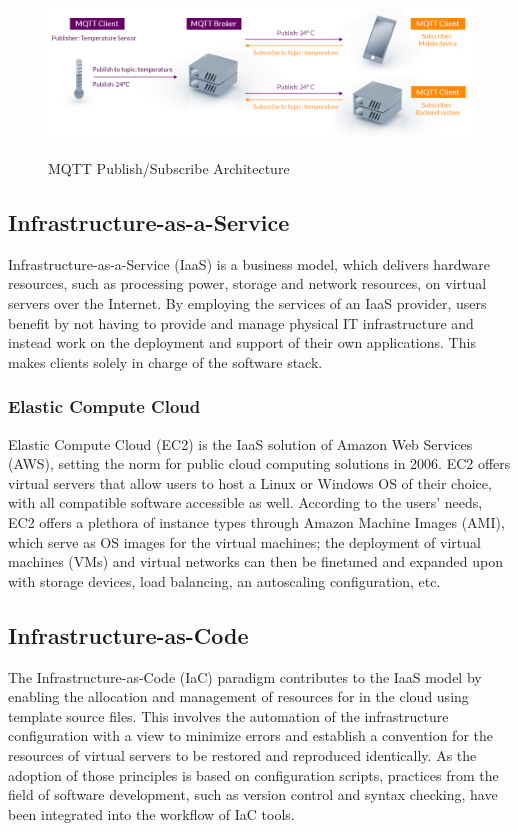 \begin{figure}[H]
	\centering
	\includegraphics[width=0.9 \linewidth]{Images/mqtt-publish-subscribe.png}
	\caption{MQTT Publish/Subscribe Architecture}
	\label{fig:MQTT_Arch}
    \cite{mqtt_arch}
\end{figure}

\subsection{Infrastructure-as-a-Service}
Infrastructure-as-a-Service (IaaS) is a business model, which delivers hardware resources, such as processing power, storage and network resources, on virtual servers over the Internet. By employing the services of an IaaS provider, users benefit by not having to provide and manage physical IT infrastructure and instead work on the deployment and support of their own applications. This makes clients solely in charge of the software stack. \cite{aws_iaas}

\subsubsection{Elastic Compute Cloud}
Elastic Compute Cloud (EC2) is the IaaS solution of Amazon Web Services (AWS), setting the norm for public cloud computing solutions in 2006. EC2 offers virtual servers that allow users to host a Linux or Windows OS of their choice, with all compatible software accessible as well. According to the users' needs, EC2 offers a plethora of instance types \cite{aws_instances} through Amazon Machine Images (AMI), which serve as OS images for the virtual machines; the deployment of virtual machines (VMs) and virtual networks can then be finetuned and expanded upon with storage devices, load balancing, an autoscaling configuration, etc. \cite{stender2020cloud}

\subsection{Infrastructure-as-Code}
The Infrastructure-as-Code (IaC) paradigm contributes to the IaaS model by enabling the allocation and management of resources for in the cloud using template source files. This involves the automation of the infrastructure configuration with a view to minimize errors and establish a convention for the resources of virtual servers to be restored and reproduced identically. As the adoption of those principles is based on configuration scripts, practices from the field of software development, such as version control and syntax checking, have been integrated into the workflow of IaC tools. \cite{stender2020cloud}

